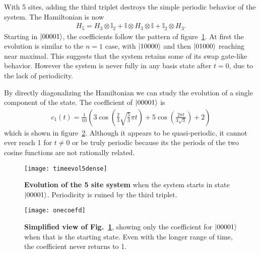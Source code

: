 With 5 sites, adding the third triplet destroys the simple periodic behavior of the system. The Hamiltonian is now
\begin{align}
H_5 = H_3\otimes\mathbb{I}_2 + \mathbb{I}\otimes H_3\otimes\mathbb{I} +
	\mathbb{I}_2\otimes H_3.
\end{align} 
Starting in $\left|00001\right\rangle$, the coefficients follow the pattern of figure~\ref{fig:timeevol5}. At first the evolution is similar to the $n=1$ case, with $\left|10000\right\rangle$ and then $\left|01000\right\rangle$ reaching near maximal. This suggests that the system retains some of its swap gate-like behavior. However the system is never fully in any basis state after $t=0$, due to the lack of periodicity.

By directly diagonalizing the Hamiltonian we can study the evolution of a single component of the state. The coefficient of $\left|00001\right\rangle$ is 
\begin{align}
c_1(t) = \frac{1}{10} \left(3 \cos \left(\frac{2}{3} \sqrt{\frac{5}{3}} \pi  t\right)+5 \cos \left(\frac{2 \pi  t}{3 \sqrt{3}}\right)+2\right)
\end{align} 
which is shown in figure~\ref{fig:onecoef}. Although it appears to be quasi-periodic, it cannot ever reach 1 for $t\ne 0$ or be truly periodic because its the periods of the two cosine functions are not rationally related.

\begin{figure}
	\centering
	\texttt{[image: timeevol5dense]}
	\caption{\textbf{Evolution of the 5 site system} when the system starts in state $\left|00001\right\rangle$. Periodicity is ruined by the third triplet.}
	\label{fig:timeevol5}
\end{figure}

\begin{figure}
	\centering
	\texttt{[image: onecoefd]}
	\caption{\textbf{Simplified view of Fig.~\ref{fig:timeevol5}}, showing only the coefficient for $\left|00001\right\rangle$ when that is the starting state. Even with the longer range of time, the coefficient never returns to 1.}
	\label{fig:onecoef}
\end{figure}



